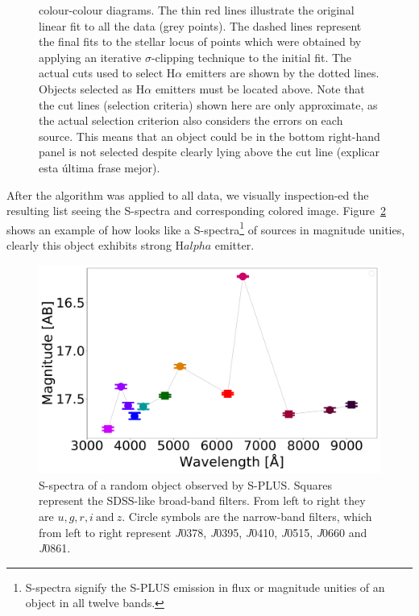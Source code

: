 \documentclass[fleqn,usenatbib]{mnras}
\begin{document}
\begin{figure}
{    colour-colour diagrams. The thin red lines illustrate the original linear
    fit to all the data (grey points). The dashed lines represent the final
    fits to the stellar locus of points which were obtained by applying an iterative
    $\sigma$-clipping technique to the initial fit. The actual cuts used to select H{$\alpha$}
    emitters are shown by the dotted lines. Objects selected as H{$\alpha$} emitters
    must be located above. Note that the cut lines (selection criteria) shown here
    are only approximate, as the actual selection criterion also considers the errors on
    each source. This means that an object could be in the bottom
    right-hand panel is not selected despite clearly lying above the cut line
    ({\sc explicar esta última frase mejor}).}
  \label{fig:criteria-color-plot}
\end{figure}

After the algorithm was applied to all data, we visually inspection-ed the
resulting list seeing the S-spectra and corresponding colored image.
Figure~\ref{fig:Spectra} shows an example of how looks like a
S-spectra\footnote{S-spectra signify the S-PLUS emission in flux
or magnitude unities of an object in all twelve bands.} of sources in
magnitude unities, clearly this object exhibits strong H$alpha$ emitter.

\begin{figure}
\includegraphics[width=0.9\linewidth]{Figs/photopectrum_splus_SPLUS-n15s22-024043_Good-LD-Halpha-DR3_noFlag_merge-takeoutbad-Final_PStotal.pdf}
\centering
{}
\caption{S-spectra of a random object observed by S-PLUS. Squares represent
  the SDSS-like broad-band filters. From left to right they are \(u, g, r,
  i~\text{and}~ z\). Circle symbols are the narrow-band filters, which from
  left to right represent \textit{J}0378, \textit{J}0395, \textit{J}0410,
  \textit{J}0515, \textit{J}0660 and \textit{J}0861.}
\label{fig:Spectra}
\end{figure}
\end{document}
